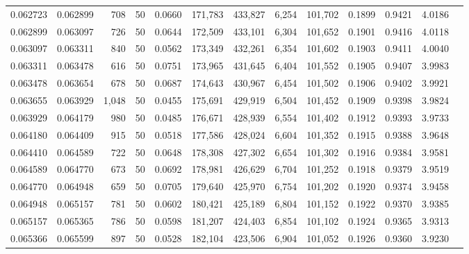 \begin{tabular}{rrrrrrrrrrrrr}
0.062723 & 0.062899 &   708 &  50 &                                     0.0660 & 171,783 & 433,827 &   6,254 & 101,702 & 0.1899 & 0.9421 & 4.0186 \\
0.062899 & 0.063097 &   726 &  50 &                                     0.0644 & 172,509 & 433,101 &   6,304 & 101,652 & 0.1901 & 0.9416 & 4.0118 \\
0.063097 & 0.063311 &   840 &  50 &                                     0.0562 & 173,349 & 432,261 &   6,354 & 101,602 & 0.1903 & 0.9411 & 4.0040 \\
0.063311 & 0.063478 &   616 &  50 &                                     0.0751 & 173,965 & 431,645 &   6,404 & 101,552 & 0.1905 & 0.9407 & 3.9983 \\
0.063478 & 0.063654 &   678 &  50 &                                     0.0687 & 174,643 & 430,967 &   6,454 & 101,502 & 0.1906 & 0.9402 & 3.9921 \\
0.063655 & 0.063929 & 1,048 &  50 &                                     0.0455 & 175,691 & 429,919 &   6,504 & 101,452 & 0.1909 & 0.9398 & 3.9824 \\
0.063929 & 0.064179 &   980 &  50 &                                     0.0485 & 176,671 & 428,939 &   6,554 & 101,402 & 0.1912 & 0.9393 & 3.9733 \\
0.064180 & 0.064409 &   915 &  50 &                                     0.0518 & 177,586 & 428,024 &   6,604 & 101,352 & 0.1915 & 0.9388 & 3.9648 \\
0.064410 & 0.064589 &   722 &  50 &                                     0.0648 & 178,308 & 427,302 &   6,654 & 101,302 & 0.1916 & 0.9384 & 3.9581 \\
0.064589 & 0.064770 &   673 &  50 &                                     0.0692 & 178,981 & 426,629 &   6,704 & 101,252 & 0.1918 & 0.9379 & 3.9519 \\
0.064770 & 0.064948 &   659 &  50 &                                     0.0705 & 179,640 & 425,970 &   6,754 & 101,202 & 0.1920 & 0.9374 & 3.9458 \\
0.064948 & 0.065157 &   781 &  50 &                                     0.0602 & 180,421 & 425,189 &   6,804 & 101,152 & 0.1922 & 0.9370 & 3.9385 \\
0.065157 & 0.065365 &   786 &  50 &                                     0.0598 & 181,207 & 424,403 &   6,854 & 101,102 & 0.1924 & 0.9365 & 3.9313 \\
0.065366 & 0.065599 &   897 &  50 &                                     0.0528 & 182,104 & 423,506 &   6,904 & 101,052 & 0.1926 & 0.9360 & 3.9230 \\

\end{tabular}
